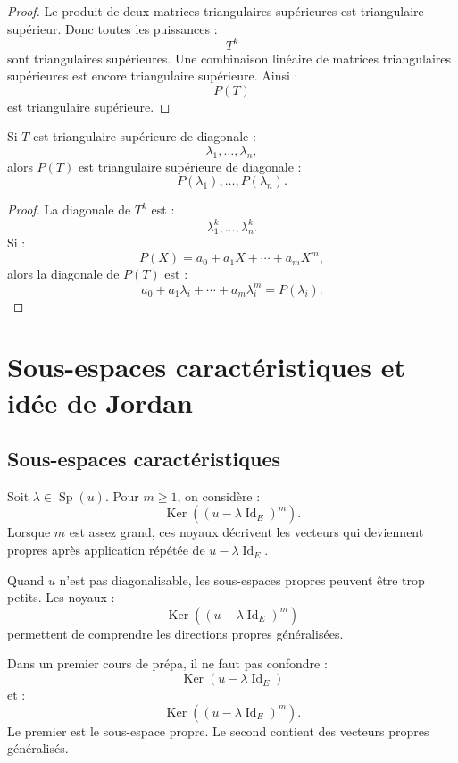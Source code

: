 \documentclass[11pt,a4paper]{article}
\newcommand{\Ker}{\operatorname{Ker}}
\newcommand{\Id}{\operatorname{Id}}
\newcommand{\Sp}{\operatorname{Sp}}
\begin{document}
\begin{proof}
Le produit de deux matrices triangulaires supérieures est triangulaire supérieur.  
Donc toutes les puissances :
\[
T^k
\]
sont triangulaires supérieures.  
Une combinaison linéaire de matrices triangulaires supérieures est encore triangulaire supérieure.  
Ainsi :
\[
P(T)
\]
est triangulaire supérieure.
\end{proof}

\begin{theorembox}
Si \(T\) est triangulaire supérieure de diagonale :
\[
\lambda_1,\dots,\lambda_n,
\]
alors \(P(T)\) est triangulaire supérieure de diagonale :
\[
P(\lambda_1),\dots,P(\lambda_n).
\]
\end{theorembox}

\begin{proof}
La diagonale de \(T^k\) est :
\[
\lambda_1^k,\dots,\lambda_n^k.
\]
Si :
\[
P(X)=a_0+a_1X+\cdots+a_mX^m,
\]
alors la diagonale de \(P(T)\) est :
\[
a_0+a_1\lambda_i+\cdots+a_m\lambda_i^m=P(\lambda_i).
\]
\end{proof}

\section{Sous-espaces caractéristiques et idée de Jordan}

\subsection{Sous-espaces caractéristiques}

\begin{definitionbox}
Soit \(\lambda\in\Sp(u)\).  
Pour \(m\geq1\), on considère :
\[
\Ker((u-\lambda\Id_E)^m).
\]
Lorsque \(m\) est assez grand, ces noyaux décrivent les vecteurs qui deviennent propres après application répétée de \(u-\lambda\Id_E\).
\end{definitionbox}

\begin{retenirbox}
Quand \(u\) n'est pas diagonalisable, les sous-espaces propres peuvent être trop petits.  
Les noyaux :
\[
\Ker((u-\lambda\Id_E)^m)
\]
permettent de comprendre les directions propres généralisées.
\end{retenirbox}

\begin{erreurbox}
Dans un premier cours de prépa, il ne faut pas confondre :
\[
\Ker(u-\lambda\Id_E)
\]
et :
\[
\Ker((u-\lambda\Id_E)^m).
\]
Le premier est le sous-espace propre.  
Le second contient des vecteurs propres généralisés.
\end{erreurbox}
\end{document}
